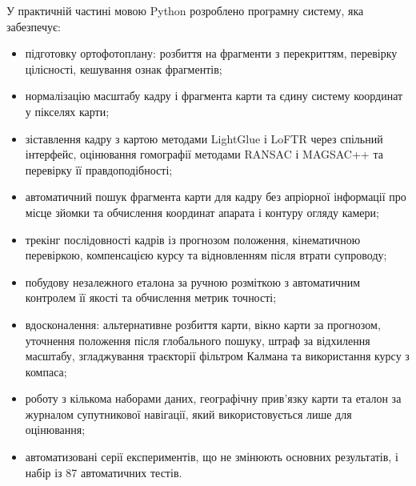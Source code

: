 \documentclass[a4paper, 12pt, titlepage]{article}
\begin{document}
У практичній частині мовою Python розроблено програмну систему, яка забезпечує:
\begin{itemize}
    \item підготовку ортофотоплану: розбиття на фрагменти з перекриттям, перевірку цілісності, кешування ознак фрагментів;
    \item нормалізацію масштабу кадру і фрагмента карти та єдину систему координат у пікселях карти;
    \item зіставлення кадру з картою методами LightGlue і LoFTR через спільний інтерфейс, оцінювання гомографії методами RANSAC і MAGSAC++ та перевірку її правдоподібності;
    \item автоматичний пошук фрагмента карти для кадру без апріорної інформації про місце зйомки та обчислення координат апарата і контуру огляду камери;
    \item трекінг послідовності кадрів із прогнозом положення, кінематичною перевіркою, компенсацією курсу та відновленням після втрати супроводу;
    \item побудову незалежного еталона за ручною розміткою з автоматичним контролем її якості та обчислення метрик точності;
    \item вдосконалення: альтернативне розбиття карти, вікно карти за прогнозом, уточнення положення після глобального пошуку, штраф за відхилення масштабу, згладжування траєкторії фільтром Калмана та використання курсу з компаса;
    \item роботу з кількома наборами даних, географічну прив'язку карти та еталон за журналом супутникової навігації, який використовується лише для оцінювання;
    \item автоматизовані серії експериментів, що не змінюють основних результатів, і набір із 87 автоматичних тестів.
\end{itemize}
\end{document}
